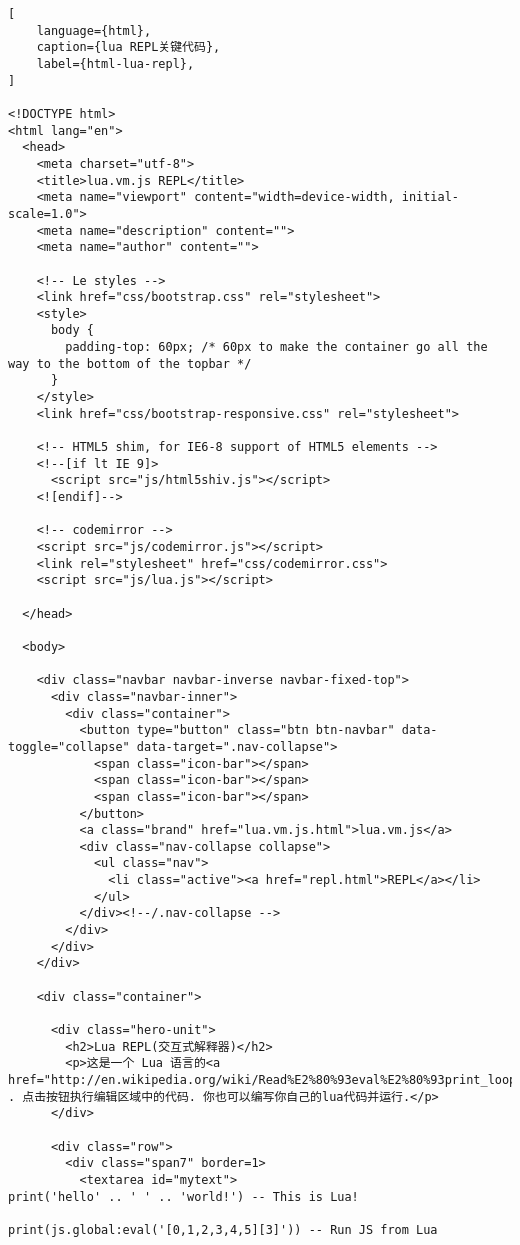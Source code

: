 \begin{lstlisting}[
    language={html},
    caption={lua REPL关键代码},
    label={html-lua-repl},
]

<!DOCTYPE html>
<html lang="en">
  <head>
    <meta charset="utf-8">
    <title>lua.vm.js REPL</title>
    <meta name="viewport" content="width=device-width, initial-scale=1.0">
    <meta name="description" content="">
    <meta name="author" content="">

    <!-- Le styles -->
    <link href="css/bootstrap.css" rel="stylesheet">
    <style>
      body {
        padding-top: 60px; /* 60px to make the container go all the way to the bottom of the topbar */
      }
    </style>
    <link href="css/bootstrap-responsive.css" rel="stylesheet">

    <!-- HTML5 shim, for IE6-8 support of HTML5 elements -->
    <!--[if lt IE 9]>
      <script src="js/html5shiv.js"></script>
    <![endif]-->

    <!-- codemirror -->
    <script src="js/codemirror.js"></script>
    <link rel="stylesheet" href="css/codemirror.css">
    <script src="js/lua.js"></script>

  </head>

  <body>

    <div class="navbar navbar-inverse navbar-fixed-top">
      <div class="navbar-inner">
        <div class="container">
          <button type="button" class="btn btn-navbar" data-toggle="collapse" data-target=".nav-collapse">
            <span class="icon-bar"></span>
            <span class="icon-bar"></span>
            <span class="icon-bar"></span>
          </button>
          <a class="brand" href="lua.vm.js.html">lua.vm.js</a>
          <div class="nav-collapse collapse">
            <ul class="nav">
              <li class="active"><a href="repl.html">REPL</a></li>
            </ul>
          </div><!--/.nav-collapse -->
        </div>
      </div>
    </div>

    <div class="container">

      <div class="hero-unit">
        <h2>Lua REPL(交互式解释器)</h2>
        <p>这是一个 Lua 语言的<a href="http://en.wikipedia.org/wiki/Read%E2%80%93eval%E2%80%93print_loop">REPL</a> . 点击按钮执行编辑区域中的代码. 你也可以编写你自己的lua代码并运行.</p>
      </div>

      <div class="row">
        <div class="span7" border=1>
          <textarea id="mytext">
print('hello' .. ' ' .. 'world!') -- This is Lua!

print(js.global:eval('[0,1,2,3,4,5][3]')) -- Run JS from Lua


\end{lstlisting}
